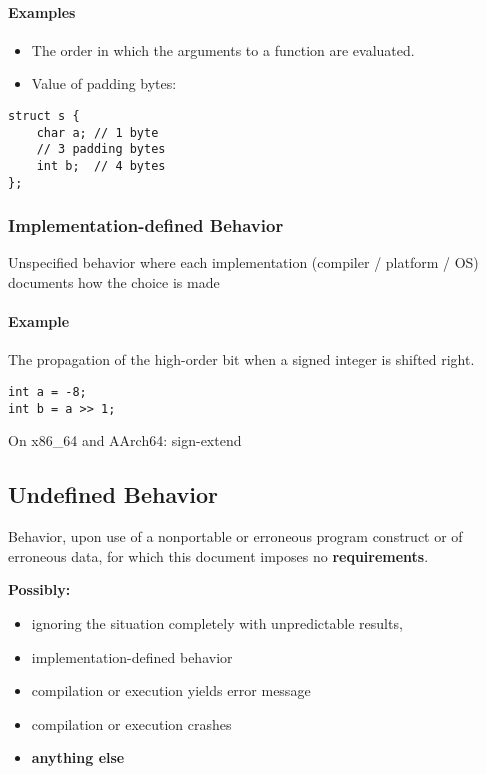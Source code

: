 \documentclass[12pt]{article}
\begin{document}
\paragraph{Examples}

\begin{itemize}
  \item The order in which the arguments to a function are evaluated.
  \item Value of padding bytes:
\end{itemize}

\begin{verbatim}
struct s {
    char a; // 1 byte
    // 3 padding bytes
    int b;  // 4 bytes
};
\end{verbatim}

\subsubsection{Implementation-defined Behavior}

Unspecified behavior where each implementation (compiler / platform / OS) documents how the choice is made

\paragraph{Example}

The propagation of the high-order bit when a signed integer is shifted right.

\begin{verbatim}
int a = -8;
int b = a >> 1;
\end{verbatim}

On x86\_64 and AArch64: sign-extend

\subsection{Undefined Behavior}

Behavior, upon use of a nonportable or erroneous program construct or of erroneous data,
for which this document imposes no \textbf{requirements}.

\textbf{Possibly:}
\begin{itemize}
    \item ignoring the situation completely with unpredictable results,
    \item implementation-defined behavior
    \item compilation or execution yields error message
    \item compilation or execution crashes
    \item \textbf{anything else}
\end{itemize}
\end{document}
